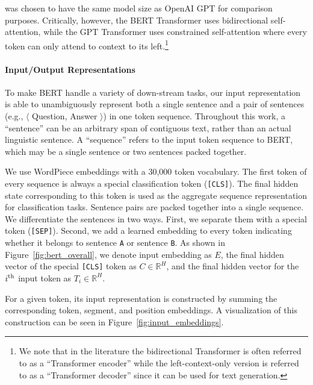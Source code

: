 \bertbase was chosen to have the same model size as OpenAI GPT for comparison purposes. Critically, however, the BERT Transformer uses bidirectional self-attention, while the GPT Transformer uses constrained self-attention where every token can only attend to context to its left.\footnote{We note that in the literature the bidirectional Transformer is often referred to as a ``Transformer encoder'' while the left-context-only version is referred to as a ``Transformer decoder'' since it can be used for text generation.} 


\paragraph{Input/Output Representations} %
To make BERT handle a variety of down-stream tasks,
our input representation is able to unambiguously represent both a single sentence and a pair of  sentences (e.g., $\langle$ Question, Answer $\rangle$) in one token sequence. Throughout this work, a ``sentence'' can be an arbitrary span of contiguous text, rather than an actual linguistic sentence. A ``sequence'' refers to the input token sequence to BERT, which may be a single sentence or two sentences packed together.

We use WordPiece embeddings \cite{wu-etal:2016:_googl} with a 30,000 token vocabulary.
The first token of every sequence is always a special classification token ({\tt [CLS]}). The final hidden state corresponding to this token is used as the aggregate sequence representation for classification tasks. 
Sentence pairs are packed together into a single sequence. We differentiate the sentences in two ways. First, we separate them with a special token ({\tt [SEP]}). Second, we add a learned embedding to every token indicating whether it belongs to sentence {\tt A} or sentence {\tt B}. 
As shown in Figure~\ref{fig:bert_overall}, we denote 
input embedding as $E$, the final hidden vector of the special {\tt [CLS]} token as $C \in \mathbb{R}^{H}$, and the final hidden vector for the $i^{\rm th}$ input token as $T_i \in \mathbb{R}^H$.

For a given token, its input representation is constructed by summing the corresponding token, segment, and position embeddings. 
A visualization of this construction can be seen in Figure~\ref{fig:input_embeddings}.

